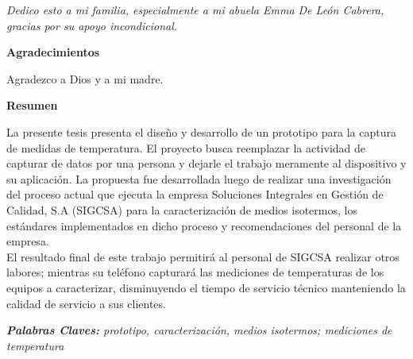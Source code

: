 \begin{flushright}
	\vspace*{\fill}
	
	\textit{Dedico esto a mi familia, especialmente a mi abuela Emma De León Cabrera, gracias por su apoyo incondicional.}
	
	\vspace*{\fill}
\end{flushright}

\clearpage

\thispagestyle{plain}
\begin{center}
	\huge
	\textbf{Agradecimientos}
\end{center}

\par \noindent
Agradezco a Dios y a mi madre.

\clearpage

\thispagestyle{plain}
\begin{center}
	\huge
	\textbf{Resumen}
\end{center}

\par \noindent
La presente tesis presenta el diseño y desarrollo de un prototipo para la captura de medidas de temperatura. El proyecto busca reemplazar la actividad de capturar de datos por una persona y dejarle el trabajo meramente al dispositivo y su aplicación. La propuesta fue desarrollada luego de realizar una investigación del proceso actual que ejecuta la empresa Soluciones Integrales en Gestión de Calidad, S.A (SIGCSA) para la caracterización de medios isotermos, los estándares implementados en dicho proceso y recomendaciones del personal de la empresa.\\ 
El resultado final de este trabajo permitirá al personal de SIGCSA realizar otros labores; mientras su teléfono capturará las mediciones de temperaturas de los equipos a caracterizar, disminuyendo el tiempo de servicio técnico manteniendo la calidad de servicio a sus clientes.

\par \noindent
\textit{\textbf{Palabras Claves:} prototipo, caracterización, medios isotermos; mediciones de temperatura}

\clearpage
